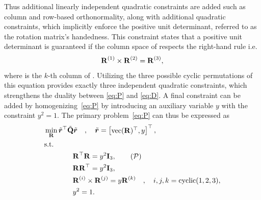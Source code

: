 Thus additional linearly independent quadratic constraints are added such as column and row-based orthonormality, along with additional quadratic constraints, which implicitly enforce the positive unit determinant, referred to as the rotation matrix's handedness. This constraint states that a positive unit determinant is guaranteed if the column space of  respects the right-hand rule i.e.
%
\begin{equation}
	\bm{\mathrm{R}}^{(1)}\times \bm{\mathrm{R}}^{(2)} = \bm{\mathrm{R}}^{(3)},
\end{equation}
where  is the $k$-th column of . Utilizing the three possible cyclic permutations of this equation provides exactly three independent quadratic constraints, which strengthens the duality between \ref{eq:P} and \ref{eq:D}. A final constraint can be added by homogenizing~\ref{eq:P} by introducing an auxiliary variable $y$ with the constraint $y^2 = 1$. The primary problem~\ref*{eq:P} can thus be expressed as
%
\begin{align*}
	&\min_{\mat{R}} \tilde{\vec{r}}^\T \tilde{\mat{Q}} \tilde{\vec{r}}  \quad , \quad \tilde{\vec{r}}=\rvec{\text{vec}(\mat{R})^\T, y}^\T, \\
	& \text{s.t. }         \\ 
	&\qquad \qquad \mat{R}^\T\mat{R} = y^2\mat{I}_3, \tag{$\mathcal{P}$} \label{eq:P}\\
	&\qquad \qquad \mat{R}\mat{R}^\T = y^2 \mat{I}_3, \\
	&\qquad \qquad \mat{R}^{(i)}\times \mat{R}^{(j)}=y \mat{R}^{(k)} \quad , \quad i,j,k = \text{cyclic}(1,2,3), \\
	&\qquad \qquad y^2 = 1.
\end{align*}

